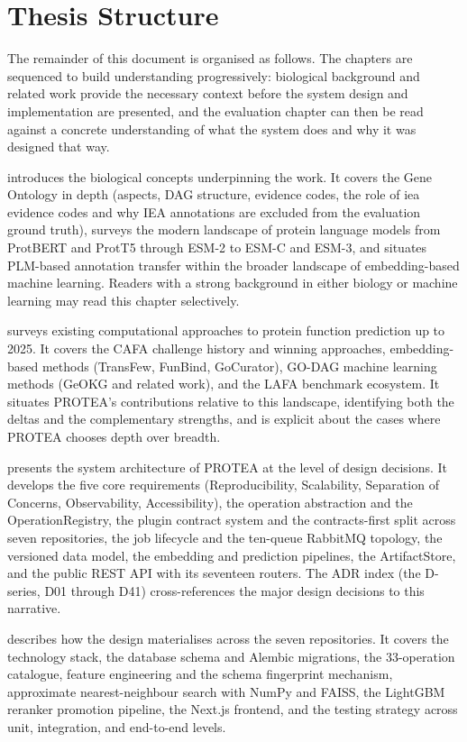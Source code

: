 \section{Thesis Structure}
\label{sec:structure}

The remainder of this document is organised as follows. The chapters are sequenced
to build understanding progressively: biological background and related work provide
the necessary context before the system design and implementation are presented, and
the evaluation chapter can then be read against a concrete understanding of what the
system does and why it was designed that way.

 introduces the biological concepts underpinning the work.
It covers the Gene Ontology in depth (aspects, DAG structure, evidence codes, the
role of \gls{iea} evidence codes and why IEA annotations are excluded from the
evaluation ground truth), surveys the modern landscape of protein language models from
ProtBERT and ProtT5 through ESM-2 to ESM-C and ESM-3, and situates PLM-based
annotation transfer within the broader landscape of embedding-based machine learning.
Readers with a strong background in either biology or machine learning may read this
chapter selectively.

 surveys existing computational approaches to protein function
prediction up to 2025. It covers the CAFA challenge history and winning approaches,
embedding-based methods (TransFew, FunBind, GoCurator), GO-DAG machine learning
methods (GeOKG and related work), and the LAFA benchmark ecosystem. It situates
PROTEA's contributions relative to this landscape, identifying both the deltas and
the complementary strengths, and is explicit about the cases where PROTEA chooses
depth over breadth.

 presents the system architecture of PROTEA at the level of
design decisions. It develops the five core requirements (Reproducibility,
Scalability, Separation of Concerns, Observability, Accessibility), the operation
abstraction and the OperationRegistry, the plugin contract system and the
contracts-first split across seven repositories, the job lifecycle and the ten-queue
RabbitMQ topology, the versioned data model, the embedding and prediction pipelines,
the ArtifactStore, and the public REST API with its seventeen routers. The ADR index
(the D-series, D01 through D41) cross-references the major design decisions to this narrative.

 describes how the design materialises across the seven
repositories. It covers the technology stack, the database schema and Alembic
migrations, the 33-operation catalogue, feature engineering and the schema
fingerprint mechanism, approximate nearest-neighbour search with NumPy and FAISS, the
LightGBM reranker promotion pipeline, the Next.js frontend, and the testing strategy
across unit, integration, and end-to-end levels.

